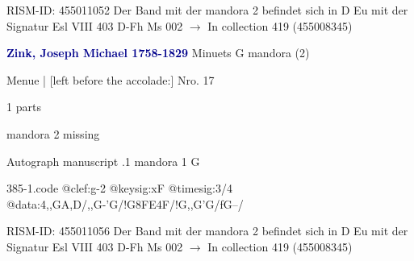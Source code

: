 \documentclass[twocolumn]{book}
\begin{document}
\newline RISM-ID: 455011052
\newline Der Band mit der mandora 2 befindet sich in D Eu mit der Signatur Esl VIII 403
\newline D-Fh  Ms 002
\newline $\rightarrow$ In collection 419 (455008345)

\newline \par \vspace{7pt} \textcolor{darkblue}{\textbf{Zink, Joseph Michael  1758-1829}}
\newline Minuets  G  
\newline mandora (2)
\newline \begin{itshape}[f.12v, at left:] Menue | [left before the accolade:] Nro. 17\end{itshape} 
\newline \textcolor{darkblue}{}  1 parts  
\newline \begin{small} mandora 2 missing\end{small} 
\newline Autograph manuscript
.1  mandora 1  G  
\begin{filecontents*}{385-1.code}
@clef:g-2
@keysig:xF
@timesig:3/4
@data:4,,GA,D/,,G-'G/!G{8FE}4F/!G,,G'G/fG--/
\end{filecontents*}
\newline
%

\newline RISM-ID: 455011056
\newline Der Band mit der mandora 2 befindet sich in D Eu mit der Signatur Esl VIII 403
\newline D-Fh  Ms 002
\newline $\rightarrow$ In collection 419 (455008345)
\end{document}
